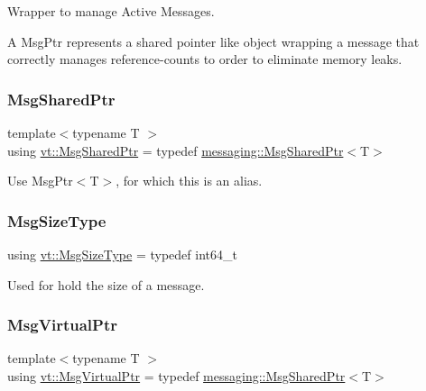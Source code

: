 Wrapper to manage Active Messages. 

A Msg\+Ptr represents a \textquotesingle{}shared pointer like\textquotesingle{} object wrapping a message that correctly manages reference-\/counts to order to eliminate memory leaks. \mbox{\label{namespacevt_ab2b3d506ec8e8d1540aede826d84a239}} 
\subsubsection{\texorpdfstring{Msg\+Shared\+Ptr}{MsgSharedPtr}}
{\footnotesize\ttfamily template$<$typename T $>$ \\
using \hyperlink{namespacevt_ab2b3d506ec8e8d1540aede826d84a239}{vt\+::\+Msg\+Shared\+Ptr} = typedef \hyperlink{structvt_1_1messaging_1_1_msg_shared_ptr}{messaging\+::\+Msg\+Shared\+Ptr}$<$T$>$}

Use {\ttfamily Msg\+Ptr$<$\+T$>$}, for which this is an alias. \mbox{\label{namespacevt_a408e86a8c7c89309b52907dc5a513924}} 
\subsubsection{\texorpdfstring{Msg\+Size\+Type}{MsgSizeType}}
{\footnotesize\ttfamily using \hyperlink{namespacevt_a408e86a8c7c89309b52907dc5a513924}{vt\+::\+Msg\+Size\+Type} = typedef int64\+\_\+t}



Used for hold the size of a message. 

\mbox{\label{namespacevt_a82b5c92ea7ca3ddd2e8a2e27df87fa1a}} 
\subsubsection{\texorpdfstring{Msg\+Virtual\+Ptr}{MsgVirtualPtr}}
{\footnotesize\ttfamily template$<$typename T $>$ \\
using \hyperlink{namespacevt_a82b5c92ea7ca3ddd2e8a2e27df87fa1a}{vt\+::\+Msg\+Virtual\+Ptr} = typedef \hyperlink{structvt_1_1messaging_1_1_msg_shared_ptr}{messaging\+::\+Msg\+Shared\+Ptr}$<$T$>$}

